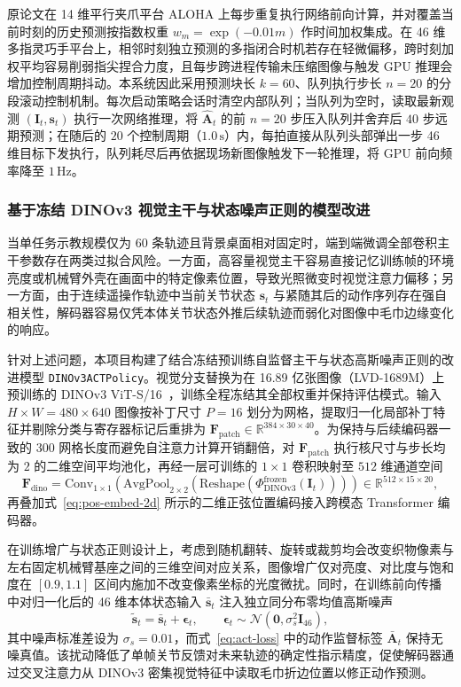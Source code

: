原论文在 14 维平行夹爪平台 ALOHA 上每步重复执行网络前向计算，并对覆盖当前时刻的历史预测按指数权重 $w_m = \exp(-0.01m)$ 作时间加权集成。在 46 维多指灵巧手平台上，相邻时刻独立预测的多指闭合时机若存在轻微偏移，跨时刻加权平均容易削弱指尖捏合力度，且每步跨进程传输未压缩图像与触发 GPU 推理会增加控制周期抖动。本系统因此采用预测块长 $k=60$、队列执行步长 $n=20$ 的分段滚动控制机制。每次启动策略会话时清空内部队列；当队列为空时，读取最新观测 $(\bm{I}_t, \bm{s}_t)$ 执行一次网络推理，将 $\hat{\bm{A}}_t$ 的前 $n = 20$ 步压入队列并舍弃后 $40$ 步远期预测；在随后的 $20$ 个控制周期（$1.0\,\mathrm{s}$）内，每拍直接从队列头部弹出一步 46 维目标下发执行，队列耗尽后再依据现场新图像触发下一轮推理，将 GPU 前向频率降至 $1\,\mathrm{Hz}$。

\subsubsection{基于冻结 DINOv3 视觉主干与状态噪声正则的模型改进}

当单任务示教规模仅为 60 条轨迹且背景桌面相对固定时，端到端微调全部卷积主干参数存在两类过拟合风险。一方面，高容量视觉主干容易直接记忆训练帧的环境亮度或机械臂外壳在画面中的特定像素位置，导致光照微变时视觉注意力偏移；另一方面，由于连续遥操作轨迹中当前关节状态 $\bm{s}_t$ 与紧随其后的动作序列存在强自相关性，解码器容易仅凭本体关节状态外推后续轨迹而弱化对图像中毛巾边缘变化的响应。

针对上述问题，本项目构建了结合冻结预训练自监督主干与状态高斯噪声正则的改进模型 \texttt{DINOv3ACTPolicy}。视觉分支替换为在 16.89 亿张图像（LVD-1689M）上预训练的 DINOv3 ViT-S/16~\cite{simeoni2025dinov3}，训练全程冻结其全部权重并保持评估模式。输入 $H\times W = 480\times 640$ 图像按补丁尺寸 $P = 16$ 划分为网格，提取归一化局部补丁特征并剔除分类与寄存器标记后重排为 $\bm{F}_{\text{patch}} \in \mathbb{R}^{384\times 30\times 40}$。为保持与后续编码器一致的 300 网格长度而避免自注意力计算开销翻倍，对 $\bm{F}_{\text{patch}}$ 执行核尺寸与步长均为 $2$ 的二维空间平均池化，再经一层可训练的 $1\times 1$ 卷积映射至 $512$ 维通道空间
\begin{equation}
  \bm{F}_{\text{dino}} = \mathrm{Conv}_{1\times 1}\!\left(\mathrm{AvgPool}_{2\times 2}\!\left(\mathrm{Reshape}\!\left(\Phi_{\text{DINOv3}}^{\text{frozen}}(\bm{I}_t)\right)\right)\right) \in \mathbb{R}^{512\times 15\times 20},
  \label{eq:dinov3-proj}
\end{equation}
再叠加式~\eqref{eq:pos-embed-2d} 所示的二维正弦位置编码接入跨模态 Transformer 编码器。

在训练增广与状态正则设计上，考虑到随机翻转、旋转或裁剪均会改变织物像素与左右固定机械臂基座之间的三维空间对应关系，图像增广仅对亮度、对比度与饱和度在 $[0.9, 1.1]$ 区间内施加不改变像素坐标的光度微扰。同时，在训练前向传播中对归一化后的 46 维本体状态输入 $\bar{\bm{s}}_t$ 注入独立同分布零均值高斯噪声
\begin{equation}
  \tilde{\bm{s}}_t = \bar{\bm{s}}_t + \bm{\epsilon}_t, \qquad \bm{\epsilon}_t \sim \mathcal{N}(\bm{0}, \sigma_s^2 \bm{I}_{46}),
  \label{eq:state-noise}
\end{equation}
其中噪声标准差设为 $\sigma_s = 0.01$，而式~\eqref{eq:act-loss} 中的动作监督标签 $\bar{\bm{A}}_t$ 保持无噪真值。该扰动降低了单帧关节反馈对未来轨迹的确定性指示精度，促使解码器通过交叉注意力从 DINOv3 密集视觉特征中读取毛巾折边位置以修正动作预测。
